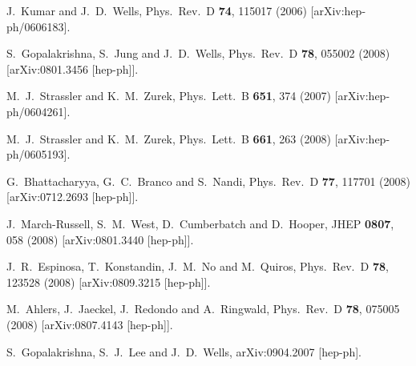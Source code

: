 \documentclass[12pt]{article}
\begin{document}
\begin{thebibliography}{9}
  J.~Kumar and J.~D.~Wells,
  Phys.\ Rev.\  D {\bf 74}, 115017 (2006)
  [arXiv:hep-ph/0606183].

  S.~Gopalakrishna, S.~Jung and J.~D.~Wells,
  Phys.\ Rev.\  D {\bf 78}, 055002 (2008)
  [arXiv:0801.3456 [hep-ph]].

   
  M.~J.~Strassler and K.~M.~Zurek,
  Phys.\ Lett.\  B {\bf 651}, 374 (2007)
  [arXiv:hep-ph/0604261].
  
  M.~J.~Strassler and K.~M.~Zurek,
  Phys.\ Lett.\  B {\bf 661}, 263 (2008)
  [arXiv:hep-ph/0605193].
  

  G.~Bhattacharyya, G.~C.~Branco and S.~Nandi,
  Phys.\ Rev.\  D {\bf 77}, 117701 (2008)
  [arXiv:0712.2693 [hep-ph]].


  J.~March-Russell, S.~M.~West, D.~Cumberbatch and D.~Hooper,
  JHEP {\bf 0807}, 058 (2008)
  [arXiv:0801.3440 [hep-ph]].

  J.~R.~Espinosa, T.~Konstandin, J.~M.~No and M.~Quiros,
  Phys.\ Rev.\  D {\bf 78}, 123528 (2008)
  [arXiv:0809.3215 [hep-ph]].

  M.~Ahlers, J.~Jaeckel, J.~Redondo and A.~Ringwald,
  Phys.\ Rev.\  D {\bf 78}, 075005 (2008)
  [arXiv:0807.4143 [hep-ph]].



  S.~Gopalakrishna, S.~J.~Lee and J.~D.~Wells,
  arXiv:0904.2007 [hep-ph].



  
\end{thebibliography}
\end{document}
